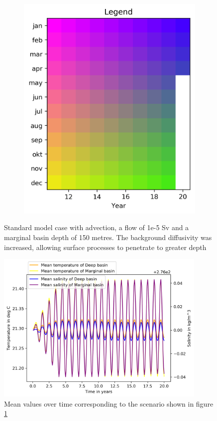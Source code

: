 \documentclass[twocolumn]{article}
\begin{document}
\begin{figure}
\begin{subfigure}[h]{0.20\textwidth}
\includegraphics[width=1.0\textwidth,keepaspectratio]{high_bg_diff_kleine_uitslag_Legend.png}
\end{subfigure}\hfill
\caption{Standard model case with advection, a flow of 1e-5 Sv and a marginal basin depth of 150 metres. The background diffusivity was increased, allowing surface processes to penetrate to greater depth}
\label{fig:high_db_success}
\end{figure}

\begin{figure}
\centering
\includegraphics[width=0.9\textwidth,keepaspectratio]{high_bg_diff_kleine_uitslag_mean_values.png}
\caption{Mean values over time corresponding to the scenario shown in figure \ref{fig:high_db_success}}
\label{fig:high_bg_diff_means}
\end{figure}\hfill
\end{document}
